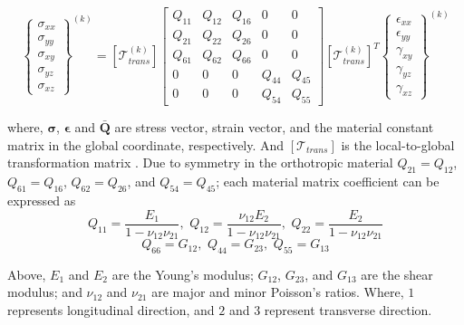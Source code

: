 \documentclass[3p,preprint,12pt]{elsarticle}
\begin{document}
\begin{equation}
\left\{\begin{array}{c}
\sigma_{xx}\\
\sigma_{yy}\\
\sigma_{xy}\\
\sigma_{yz}\\
\sigma_{xz}
\end{array}\right\}^{\left(k\right)}
=
\left[\mathcal{T}_{trans}^{\left(k\right)}\right]
\left[\begin{array}{ccccc}
Q_{11} & Q_{12} & Q_{16} & 0 & 0\\
Q_{21} & Q_{22} & Q_{26} & 0 & 0\\
Q_{61} & Q_{62} & Q_{66} & 0 & 0\\
0 & 0 & 0 & Q_{44} & Q_{45}\\
0 & 0 & 0 & Q_{54} & Q_{55}
\end{array}\right]
\left[\mathcal{T}_{trans}^{\left(k\right)}\right]^{T} 
\left\{\begin{array}{c}
\epsilon_{xx}\\
\epsilon_{yy}\\
\gamma_{xy}\\
\gamma_{yz}\\
\gamma_{xz}
\end{array}\right\}^{\left(k\right)}
\end{equation}

where, $ \boldsymbol{\sigma} $, $\boldsymbol{\epsilon} $ and $ \boldsymbol{\bar{Q}} $ are stress vector, strain vector, and the material	constant matrix  in the global coordinate, respectively. And $\left[ \mathcal{T}_{trans} \right]$	is the local-to-global transformation matrix \cite{reddy2004mechanics}. Due to symmetry in the orthotropic material $Q_{21}=Q_{12}$, $Q_{61}=Q_{16}$, $Q_{62}=Q_{26}$, and $Q_{54}=Q_{45}$; each material matrix coefficient can be expressed as
\begin{equation*}
Q_{11}=\frac{E_{1}}{1-\nu_{12}\nu_{21}},\,\,Q_{12}=\frac{\nu_{12}E_{2}}{1-\nu_{12}\nu_{21}},\,\,Q_{22}=\frac{E_{2}}{1-\nu_{12}\nu_{21}}
\end{equation*}
\begin{equation*}
Q_{66}=G_{12},\,\,Q_{44}=G_{23},\,\,Q_{55}=G_{13}
\end{equation*}

Above, $E_{1}$ and $E_{2}$ are the Young's modulus; $G_{12}$, $G_{23}$, and $G_{13}$ are the shear modulus; and $\nu_{12}$ and $\nu_{21}$ are major and minor Poisson's ratios. Where, $1$ represents longitudinal direction, and $2$ and $3$ represent transverse direction.
\end{document}
